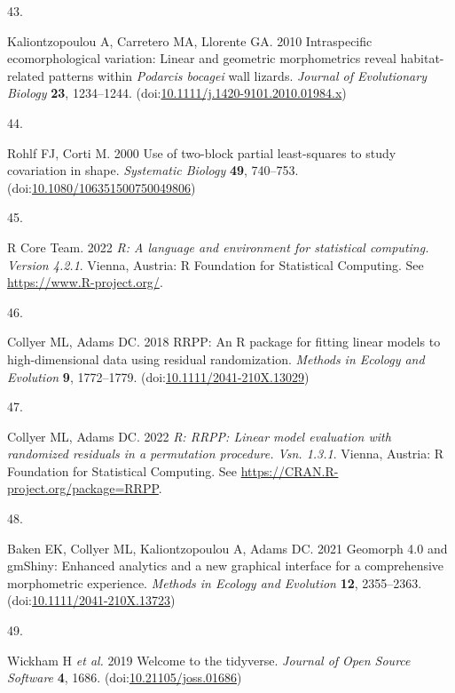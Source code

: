 \documentclass[
  11pt,
]{article}
\newlength{\cslhangindent}
\newlength{\csllabelwidth}
\newlength{\cslentryspacingunit} %
\newenvironment{CSLReferences}[2] %
 {%
  \setlength{\parindent}{0pt}
  \ifodd #1
  \let\oldpar\par
  \def\par{\hangindent=\cslhangindent\oldpar}
  \fi
  \setlength{\parskip}{#2\cslentryspacingunit}
 }%
 {}
\newcommand{\CSLLeftMargin}[1]{\parbox[t]{\csllabelwidth}{#1}}
\newcommand{\CSLRightInline}[1]{\parbox[t]{\linewidth - \csllabelwidth}{#1}\break}
\begin{document}
\begin{CSLReferences}{0}{0}
\leavevmode{}%
\CSLLeftMargin{43. }%
\CSLRightInline{Kaliontzopoulou A, Carretero MA, Llorente GA. 2010
Intraspecific ecomorphological variation: Linear and geometric
morphometrics reveal habitat-related patterns within \emph{{P}odarcis
bocagei} wall lizards. \emph{Journal of Evolutionary Biology}
\textbf{23}, 1234--1244.
(doi:\href{https://doi.org/10.1111/j.1420-9101.2010.01984.x}{10.1111/j.1420-9101.2010.01984.x})}

\leavevmode{}%
\CSLLeftMargin{44. }%
\CSLRightInline{Rohlf FJ, Corti M. 2000 Use of two-block partial
least-squares to study covariation in shape. \emph{Systematic Biology}
\textbf{49}, 740--753.
(doi:\href{https://doi.org/10.1080/106351500750049806}{10.1080/106351500750049806})}

\leavevmode{}%
\CSLLeftMargin{45. }%
\CSLRightInline{R Core Team. 2022 \emph{R: A language and environment
for statistical computing. Version 4.2.1}. Vienna, Austria: R Foundation
for Statistical Computing. See \url{https://www.R-project.org/}.}

\leavevmode{}%
\CSLLeftMargin{46. }%
\CSLRightInline{Collyer ML, Adams DC. 2018 RRPP: An {R} package for
fitting linear models to high-dimensional data using residual
randomization. \emph{Methods in Ecology and Evolution} \textbf{9},
1772--1779.
(doi:\href{https://doi.org/10.1111/2041-210X.13029}{10.1111/2041-210X.13029})}

\leavevmode{}%
\CSLLeftMargin{47. }%
\CSLRightInline{Collyer ML, Adams DC. 2022 \emph{R: RRPP: Linear model
evaluation with randomized residuals in a permutation procedure. Vsn.
1.3.1}. Vienna, Austria: R Foundation for Statistical Computing. See
\url{https://CRAN.R-project.org/package=RRPP}.}

\leavevmode{}%
\CSLLeftMargin{48. }%
\CSLRightInline{Baken EK, Collyer ML, Kaliontzopoulou A, Adams DC. 2021
Geomorph 4.0 and gmShiny: Enhanced analytics and a new graphical
interface for a comprehensive morphometric experience. \emph{Methods in
Ecology and Evolution} \textbf{12}, 2355--2363.
(doi:\href{https://doi.org/10.1111/2041-210X.13723}{10.1111/2041-210X.13723})}

\leavevmode{}%
\CSLLeftMargin{49. }%
\CSLRightInline{Wickham H \emph{et al.} 2019 Welcome to the {tidyverse}.
\emph{Journal of Open Source Software} \textbf{4}, 1686.
(doi:\href{https://doi.org/10.21105/joss.01686}{10.21105/joss.01686})}


\end{CSLReferences}
\end{document}
